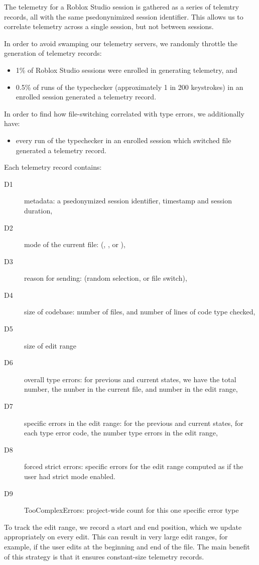 \documentclass[english,submission,cleveref]{programming}
\begin{document}
The telemetry for a Roblox Studio session is gathered as a series of
telemtry records, all with the same psedonynimized session
identifier. This allows us to correlate telemetry across a single
session, but not between sessions.

In order to avoid swamping our telemetry servers, we randomly throttle
the generation of telemetry records:
\begin{itemize}
  \item
    1\% of Roblox Studio sessions were enrolled in generating telemetry, and
  \item
    0.5\% of runs of the typechecker (approximately 1 in 200 keystrokes)
      in an enrolled session generated a telemetry record.
\end{itemize}
In order to find how file-switching correlated with type errors, we additionally have:
\begin{itemize}
  \item
    every run of the typechecker in an enrolled session which switched file generated a telemetry record.
\end{itemize}
Each telemetry record contains:
\begin{description}
  \item[D1] metadata: a psedonymized session identifier, timestamp and session duration,
  \item[D2] mode of the current file: (\mnocheck{}, \mnonstrict{}, or \mstrict{}),
  \item[D3] reason for sending: (random selection, or file switch),
  \item[D4] size of codebase: number of files, and number of lines of code type checked,
  \item[D5] size of edit range
  \item[D6] overall type errors: for previous and current states, we have the total number, the nunber in the current file, and number in the edit range,
  \item[D7] specific errors in the edit range: for the previous and current states, for each type error code, the number type errors in the edit range,
  \item[D8] forced strict errors: specific errors for the
    edit range computed as if the user had strict mode enabled.
  \item[D9] TooComplexErrors: project-wide count for this one specific error type
\end{description}
To track the edit range, we record a start and end position, which we
update appropriately on every edit. This can result in very large edit
ranges, for example, if the user edits at the beginning and end of the
file.
The main benefit of this strategy is that it ensures constant-size telemetry records.
\end{document}
